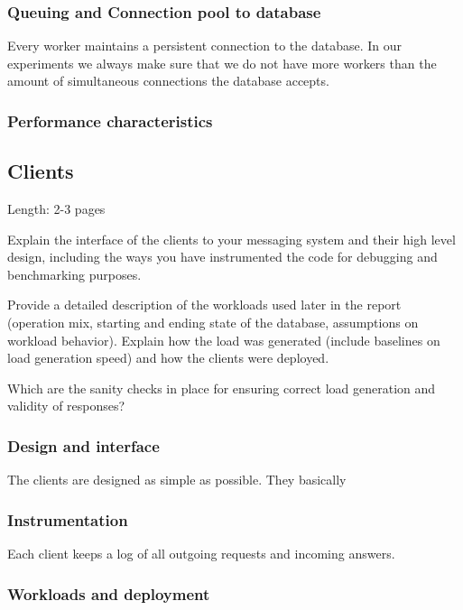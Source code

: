 \documentclass[11pt]{article}
\begin{document}
\subsubsection{Queuing and Connection pool to database}\label{sec:queuing-and-connection-pool-to-database}
Every worker maintains a persistent connection to the database. In our experiments we always make sure that we do not have more workers than the amount of simultaneous connections the database accepts.
\subsubsection{Performance characteristics}\label{sec:performance-characteristics-1}

\subsection{Clients}\label{sec:clients}

Length: 2-3 pages

Explain the interface of the clients to your messaging system and their
high level design, including the ways you have instrumented the code for
debugging and benchmarking purposes.

Provide a detailed description of the workloads used later in the report
(operation mix, starting and ending state of the database, assumptions
on workload behavior). Explain how the load was generated (include
baselines on load generation speed) and how the clients were deployed.

Which are the sanity checks in place for ensuring correct load
generation and validity of responses?

\subsubsection{Design and interface}\label{sec:design-and-interface}
The clients are designed as simple as possible. They basically 
\subsubsection{Instrumentation}\label{sec:instrumentation}
Each client keeps a log of all outgoing requests and incoming answers.
\subsubsection{Workloads and deployment}\label{sec:workloads-and-deployment}
\end{document}

